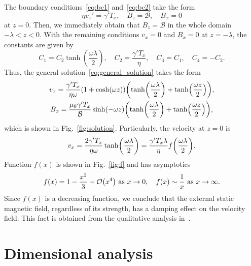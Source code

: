 \documentclass{article}
\begin{document}
The boundary conditions~\eqref{eq:bc1} and~\eqref{eq:bc2} take the form
\begin{equation}\label{eq:bc}
    \eta v_x' = \gamma'T_x, \quad B_z = \mathcal{B}, \quad B_x = 0
\end{equation}
at $z=0$.
Then, we immediately obtain that $B_z=\mathcal{B}$ in the whole domain $-\lambda<z<0$.
With the remaining conditions $v_x=0$ and $B_x=0$ at $z=-\lambda$,
the constants are given by
\begin{equation}\label{eq:constants}
    C_1 = C_2\tanh(\frac{\omega\lambda}2), \quad
    C_2 = \frac{\gamma'T_x}{\eta}, \quad
    C_3 = C_1, \quad C_4 = -C_2.
\end{equation}
Thus, the general solution~\eqref{eq:general_solution} takes the form
\begin{gather}
    v_x = \frac{\gamma'T_x}{\eta\omega}(1+\cosh(\omega z))
        \qty(\tanh(\frac{\omega\lambda}2) + \tanh(\frac{\omega z}2)), \label{eq:v_x}\\
    B_x = \frac{\mu_0\gamma'T_x}{\mathcal{B}}\sinh(-\omega z)
        \qty(\tanh(\frac{\omega\lambda}2) + \tanh(\frac{\omega z}2)), \label{eq:B_x}
\end{gather}
which is shown in Fig.~\ref{fig:solution}.
Particularly, the velocity at $z=0$ is
\begin{equation}\label{eq:velocity}
    v_x = \frac{2\gamma'T_x}{\eta\omega}\tanh(\frac{\omega\lambda}2)
        = \frac{\gamma'T_x\lambda}{\eta} f\qty(\frac{\omega\lambda}2).
\end{equation}
Function $f(x)$ is shown in Fig.~\ref{fig:f} and has asymptotics
\begin{equation}\label{eq:f_asym}
    f(x) = 1 - \frac{x^2}{3} + \order{x^4} \text{ as } x\to0, \quad
    f(x) \sim \frac1x \text{ as } x\to\infty.
\end{equation}
Since $f(x)$ is a decreasing function,
we conclude that the external static magnetic field, regardless of its strength,
has a damping effect on the velocity field.
This fact is obtained from the qualitative analysis in~\cite{du2019influence}.

\section{Dimensional analysis}
\end{document}
